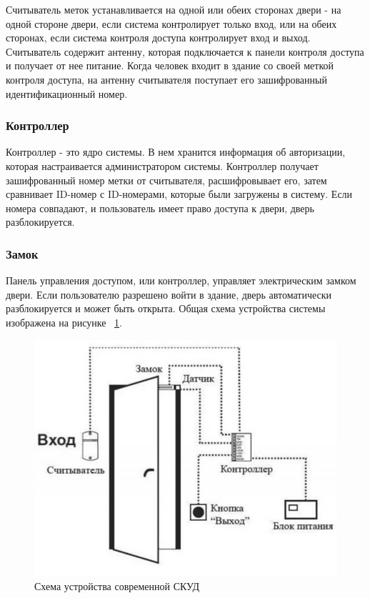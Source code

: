 Считыватель меток устанавливается на одной или обеих сторонах двери - на одной стороне двери, если система контролирует только вход, или на обеих сторонах, если система контроля доступа контролирует вход и выход. Считыватель содержит антенну, которая подключается к панели контроля доступа и получает от нее питание.
Когда человек входит в здание со своей меткой контроля доступа, на антенну считывателя поступает его зашифрованный идентификационный номер.

\subsubsection {Контроллер}

Контроллер - это ядро системы. В нем хранится информация об авторизации, которая настраивается администратором системы. Контроллер получает зашифрованный номер метки от считывателя, расшифровывает его, затем сравнивает ID-номер с ID-номерами, которые были загружены в систему. Если номера совпадают, и пользователь имеет право доступа к двери, дверь разблокируется.

\subsubsection {Замок}

Панель управления доступом, или контроллер, управляет электрическим замком двери. Если пользователю разрешено войти в здание, дверь автоматически разблокируется и может быть открыта.
Общая схема устройства системы изображена на рисунке ~\ref{fig:commonscheme1}.
\begin{figure}
	\centering
	\includegraphics[width=0.7\linewidth]{images/CommonScheme1}
	\caption{Схема устройства современной СКУД}
	\label{fig:commonscheme1}
\end{figure}

